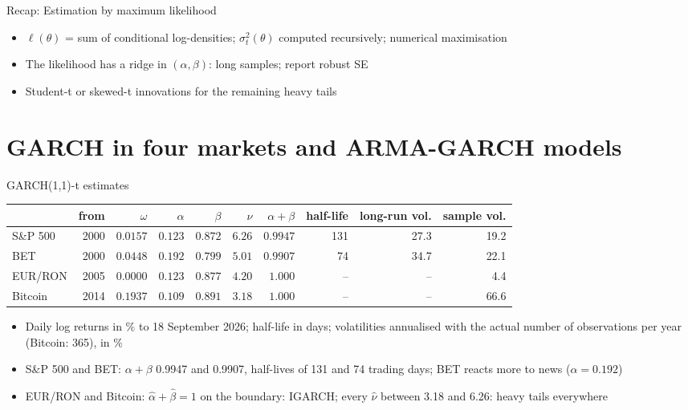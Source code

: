 \begin{frame}{Recap: Estimation by maximum likelihood}
\itemsize{\small}
\begin{itemize}
    \item $\ell(\theta)$ = sum of conditional log-densities; $\sigma_t^2(\theta)$ computed recursively; numerical maximisation
    \item The likelihood has a ridge in $(\alpha, \beta)$: long samples; report robust SE
    \item Student-t or skewed-t innovations for the remaining heavy tails
\end{itemize}
\end{frame}


\section{GARCH in four markets and ARMA-GARCH models}

\begin{frame}{GARCH(1,1)-t estimates}
\itemsize{\footnotesize}
\begin{center}
\scriptsize
\begin{tabular}{lrrrrrrrrr}
\toprule
& from & $\omega$ & $\alpha$ & $\beta$ & $\nu$ & $\alpha + \beta$ & half-life & long-run vol. & sample vol. \\
\midrule
S\&P 500 & 2000 & $0.0157$ & $0.123$ & $0.872$ & $6.26$ & $0.9947$ & 131 & 27.3 & 19.2 \\
BET & 2000 & $0.0448$ & $0.192$ & $0.799$ & $5.01$ & $0.9907$ & 74 & 34.7 & 22.1 \\
EUR/RON & 2005 & $0.0000$ & $0.123$ & $0.877$ & $4.20$ & $1.000$ & -- & -- & 4.4 \\
Bitcoin & 2014 & $0.1937$ & $0.109$ & $0.891$ & $3.18$ & $1.000$ & -- & -- & 66.6 \\
\bottomrule
\end{tabular}
\end{center}
\begin{itemize}
    \item Daily log returns in \% to 18 September 2026; half-life in days; volatilities annualised with the actual number of observations per year (Bitcoin: 365), in \%
    \item S\&P 500 and BET: $\alpha + \beta$ 0.9947 and 0.9907, half-lives of 131 and 74 trading days; BET reacts more to news ($\alpha = 0.192$)
    \item EUR/RON and Bitcoin: $\hat\alpha + \hat\beta = 1$ on the boundary: IGARCH; every $\hat\nu$ between 3.18 and 6.26: heavy tails everywhere
\end{itemize}
\end{frame}

